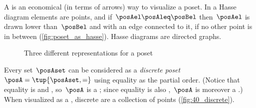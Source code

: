 \label{sec:hasse-diagram}
A  is an economical (in terms of arrows) way to visualize a poset.
In a Hasse diagram elements are points, and if~$\posAel \posAleq \posBel$ then~$\posAel$ is drawn lower than~$\posBel$ and with an edge connected to it, if no other point is in between (\cref{fig:poset_as_hasse}).
Hasse diagrams are directed graphs.

\begin{figure}[h!]
    \hspace{4em}
    \hspace{4em}
    \hspace{4em}
    \caption{Three different representations for a poset}
    \label{fig:poset_representation}
\end{figure}

\begin{marginfigure}
    \centering
    \caption{}
    \label{fig:40_discrete}
\end{marginfigure}

\begin{example}

    \label{ex:discreteposet}
    Every set~$\posAset$ can be considered as a \emph{discrete poset}~$\posA = \tup{\posAset,{{=}}}$ using equality as the partial order.
    (Notice that equality is  and , so~$\posA$ is a ; since equality is also ,~$\posA$ is moreover a .)
    When visualized as a , discrete  are a collection of points (\cref{fig:40_discrete}).
\end{example}
\vspace{1cm}
\begin{marginfigure}[4mm]
    \centering
    \caption{}
\end{marginfigure}

